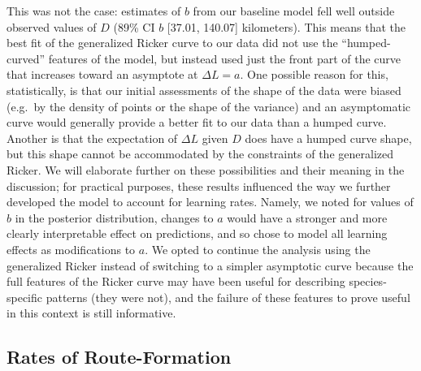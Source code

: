 \documentclass[twoside,12pt,final]{ucthesis-CA2012}
\begin{document}
\begin{ucmainmatter}
This was not the case: estimates of \(b\) from our baseline model fell well outside observed values of \(D\) (89\% CI \(b\) {[}37.01, 140.07{]} kilometers). This means that the best fit of the generalized Ricker curve to our data did not use the ``humped-curved'' features of the model, but instead used just the front part of the curve that increases toward an asymptote at \(\Delta L = a\). One possible reason for this, statistically, is that our initial assessments of the shape of the data were biased (e.g.~by the density of points or the shape of the variance) and an asymptomatic curve would generally provide a better fit to our data than a humped curve. Another is that the expectation of \(\Delta L\) given \(D\) does have a humped curve shape, but this shape cannot be accommodated by the constraints of the generalized Ricker. We will elaborate further on these possibilities and their meaning in the discussion; for practical purposes, these results influenced the way we further developed the model to account for learning rates. Namely, we noted for values of \(b\) in the posterior distribution, changes to \(a\) would have a stronger and more clearly interpretable effect on predictions, and so chose to model all learning effects as modifications to \(a\). We opted to continue the analysis using the generalized Ricker instead of switching to a simpler asymptotic curve because the full features of the Ricker curve may have been useful for describing species-specific patterns (they were not), and the failure of these features to prove useful in this context is still informative.

\hypertarget{rates-of-route-formation}{%
\subsection{Rates of Route-Formation}\label{rates-of-route-formation}}


\end{ucmainmatter}
\end{document}
